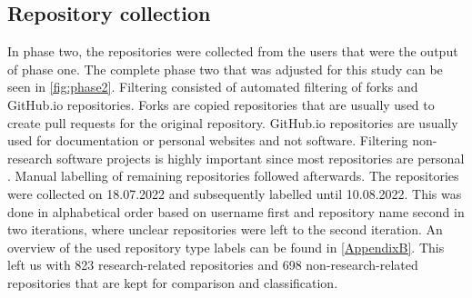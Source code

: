 \newpage
\subsection{Repository collection}

In phase two, the repositories were collected from the users that were the output of phase one. The complete phase two that was adjusted for this study can be seen in \autoref{fig:phase2}. Filtering consisted of automated filtering of forks and GitHub.io repositories. Forks are copied repositories that are usually used to create pull requests for the original repository. GitHub.io repositories are usually used for documentation or personal websites and not software. Filtering non-research software projects is highly important since most repositories are personal \cite{cosentino_systematic_2017, kalliamvakou_promises_2014}. 
Manual labelling of remaining repositories followed afterwards. The repositories were collected on 18.07.2022 and subsequently labelled until 10.08.2022. This was done in alphabetical order based on username first and repository name second in two iterations, where unclear repositories were left to the second iteration. An overview of the used repository type labels can be found in \autoref{AppendixB}. 
This left us with 823 research-related repositories and 698 non-research-related repositories that are kept for comparison and classification. 

